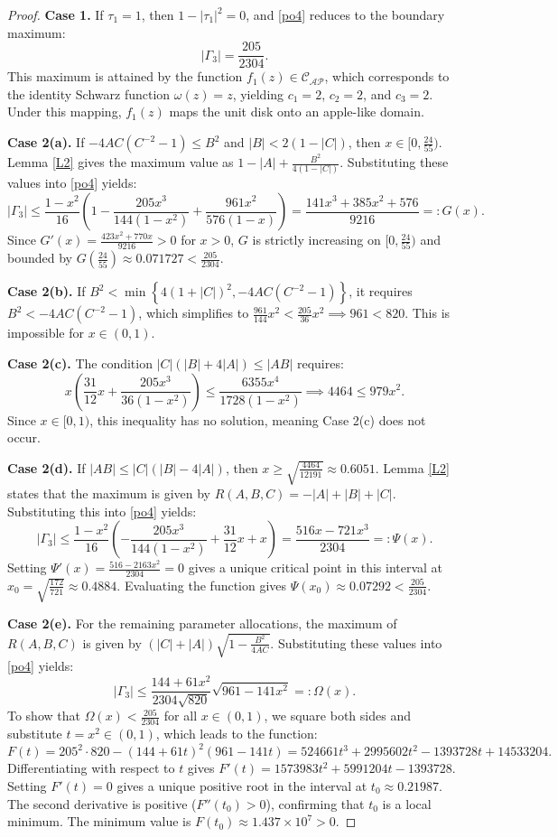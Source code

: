 \documentclass[11pt]{article}
\numberwithin{equation}{section}
\begin{document}
\begin{proof}
\medskip
\noindent \textbf{Case 1.} If $\tau_1 = 1$, then $1-|\tau_1|^2 = 0$, and \eqref{po4} reduces to the boundary maximum:
\[
|\Gamma_3| = \frac{205}{2304}.
\]
This maximum is attained by the function $f_1(z) \in \mathcal{C}_{\mathcal{AP}}$, which corresponds to the identity Schwarz function $\omega(z) = z$, yielding $c_1=2$, $c_2=2$, and $c_3=2$. Under this mapping, $f_1(z)$ maps the unit disk onto an apple-like domain.

\medskip
\noindent \textbf{Case 2(a).} If $-4AC(C^{-2}-1) \le B^2$ and $|B| < 2(1-|C|)$, then $x \in [0, \frac{24}{55})$. Lemma \ref{L2} gives the maximum value as $1 - |A| + \frac{B^2}{4(1-|C|)}$. Substituting these values into \eqref{po4} yields:
\[
|\Gamma_3| \le \frac{1-x^2}{16} \left( 1 - \frac{205x^3}{144(1-x^2)} + \frac{961x^2}{576(1-x)}\right) = \frac{141x^3 + 385x^2 + 576}{9216} =: G(x).
\]
Since $G'(x) = \frac{423x^2 + 770x}{9216} > 0$ for $x > 0$, $G$ is strictly increasing on $[0, \frac{24}{55})$ and bounded by $G\left( \frac{24}{55} \right) \approx 0.071727 < \frac{205}{2304}$.

\medskip
\noindent \textbf{Case 2(b).} If $B^2 < \min\left\{4(1+|C|)^2, -4AC(C^{-2}-1)\right\}$, it requires $B^2 < -4AC(C^{-2}-1)$, which simplifies to $\frac{961}{144}x^2 < \frac{205}{36}x^2 \implies 961 < 820$. This is impossible for $x \in (0,1)$.

\medskip
\noindent \textbf{Case 2(c).} The condition $|C|(|B|+4|A|) \le |AB|$ requires:
\[
x \left( \frac{31}{12}x + \frac{205x^3}{36(1-x^2)} \right) \le \frac{6355x^4}{1728(1-x^2)} \implies 4464 \le 979x^2.
\]
Since $x \in [0,1)$, this inequality has no solution, meaning Case 2(c) does not occur.

\medskip
\noindent \textbf{Case 2(d).} If $|AB| \le |C|(|B|-4|A|)$, then $x \ge \sqrt{\frac{4464}{12191}} \approx 0.6051$. Lemma \ref{L2} states that the maximum is given by $R(A,B,C) = -|A| + |B| + |C|$. Substituting this into \eqref{po4} yields:
\[
|\Gamma_3| \le \frac{1-x^2}{16}\left( -\frac{205x^3}{144(1-x^2)} + \frac{31}{12}x + x \right) = \frac{516x - 721x^3}{2304} =: \Psi(x).
\]
Setting $\Psi'(x) = \frac{516 - 2163x^2}{2304} = 0$ gives a unique critical point in this interval at $x_0 = \sqrt{\frac{172}{721}} \approx 0.4884$. Evaluating the function gives $\Psi(x_0) \approx 0.07292 < \frac{205}{2304}$.

\medskip
\noindent \textbf{Case 2(e).} For the remaining parameter allocations, the maximum of $R(A,B,C)$ is given by $(|C|+|A| )\sqrt{1-\frac{B^2}{4AC}}$. Substituting these values into \eqref{po4} yields:
\[
|\Gamma_3| \le \frac{144+61x^2}{2304\sqrt{820}} \sqrt{961-141x^2} =: \Omega(x).
\]
To show that $\Omega(x) < \frac{205}{2304}$ for all $x \in (0,1)$, we square both sides and substitute $t = x^2 \in (0,1)$, which leads to the function:
\[
F(t) = 205^2 \cdot 820 - (144+61t)^2(961-141t) = 524661t^3 + 2995602t^2 - 1393728t + 14533204.
\]
Differentiating with respect to $t$ gives $F'(t) = 1573983t^2 + 5991204t - 1393728$. Setting $F'(t) = 0$ gives a unique positive root in the interval at $t_0 \approx 0.21987$. The second derivative is positive ($F''(t_0) > 0$), confirming that $t_0$ is a local minimum. The minimum value is $F(t_0) \approx 1.437 \times 10^7 > 0$.


\end{proof}
\end{document}
